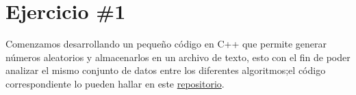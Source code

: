 \section*{Ejercicio \#1}
Comenzamos desarrollando un pequeño código en C++ que permite generar números aleatorios y almacenarlos en un archivo de texto, esto con el fin de poder analizar el mismo conjunto de datos entre los diferentes algoritmos;el código correspondiente lo pueden hallar en este \href{https://github.com/syordya/CSUNSA-EDA}{repositorio}.

\iffalse
Como se muestra en la figuras \ref{fig:act-1_a} y \ref{fig:act-1_b}.
\begin{figure}[H]
\centering
\begin{minipage}{0.45\textwidth}
  \centering
  \texttt{[image: act-1\_a]}
  \caption{Envío de \textit{ICMP ECHO REQUEST} de PC0 a PC1, PC2 y PC3.}
  \label{fig:act-1_a}
\end{minipage}\hfill
\begin{minipage}{0.45\textwidth}
  \centering
  \texttt{[image: act-1\_b]}
  \caption{Respuesta de PC1, PC2 y PC3. Tabla ARP de PC0.}
  \label{fig:act-1_b}
\end{minipage}
\end{figure}
Como se muestra en la figura \ref{fig:act-3}
\begin{figure}[H]
  \centering
  \texttt{[image: act-3]}
  \caption{Tabla de subneteo para la red 192.168.100.0.}
  \label{fig:act-3}
\end{figure}
\fi